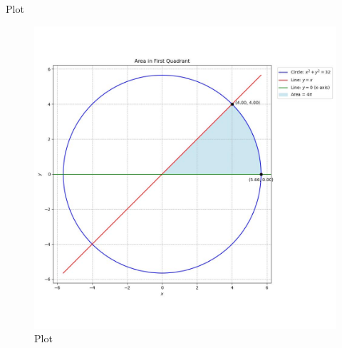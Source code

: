 \documentclass{beamer}
\begin{document}
\begin{frame}{Plot}
\begin{figure}
	\centering
	\includegraphics[width=0.5\columnwidth]{../figs/plot_c.jpg}
	\caption{Plot}
	\label{fig:fig}
\end{figure}
\end{frame}
\end{document}
